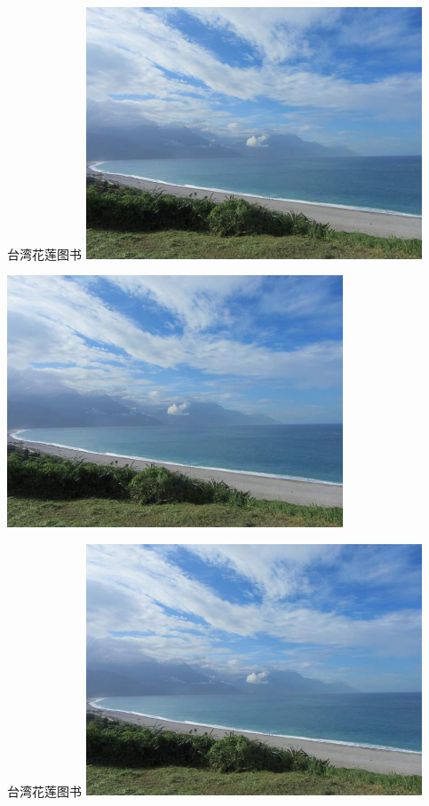 \begin{Figure}{台湾花莲图书}
    \includegraphics[width=0.75\textwidth]{./contents/test.jpg}
\end{Figure}

\begin{Figure}{}
    \includegraphics[width=0.75\textwidth]{./contents/test.jpg}
\end{Figure}

\begin{Figure}{台湾花莲图书}
    \includegraphics[width=0.75\textwidth]{./contents/test.jpg}
\end{Figure}

